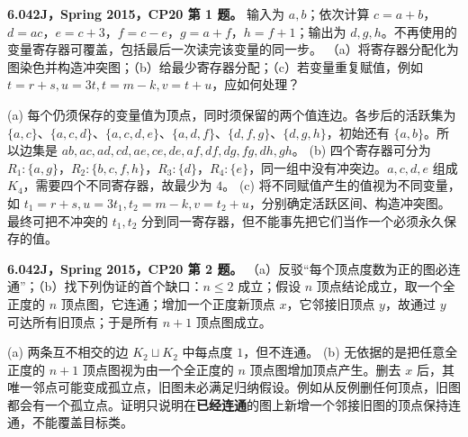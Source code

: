 \begin{exercise}\label{mit:6042-cp20-q1}
\textbf{6.042J，Spring 2015，CP20 第 1 题。}
输入为 $a,b$；依次计算 $c=a+b$，$d=ac$，$e=c+3$，$f=c-e$，$g=a+f$，$h=f+1$；输出为 $d,g,h$。不再使用的变量寄存器可覆盖，包括最后一次读完该变量的同一步。
（a）将寄存器分配化为图染色并构造冲突图；（b）给最少寄存器分配；（c）若变量重复赋值，例如 $t=r+s,u=3t,t=m-k,v=t+u$，应如何处理？
\end{exercise}
\begin{solution}
(a) 每个仍须保存的变量值为顶点，同时须保留的两个值连边。各步后的活跃集为
$\{a,c\}$、$\{a,c,d\}$、$\{a,c,d,e\}$、$\{a,d,f\}$、$\{d,f,g\}$、$\{d,g,h\}$，初始还有 $\{a,b\}$。所以边集是
$ab,ac,ad,cd,ae,ce,de,af,df,dg,fg,dh,gh$。
(b) 四个寄存器可分为 $R_1:\{a,g\}$，$R_2:\{b,c,f,h\}$，$R_3:\{d\}$，$R_4:\{e\}$，同一组中没有冲突边。$a,c,d,e$ 组成 $K_4$，需要四个不同寄存器，故最少为 $4$。
(c) 将不同赋值产生的值视为不同变量，如 $t_1=r+s,u=3t_1,t_2=m-k,v=t_2+u$，分别确定活跃区间、构造冲突图。最终可把不冲突的 $t_1,t_2$ 分到同一寄存器，但不能事先把它们当作一个必须永久保存的值。
\end{solution}

\begin{exercise}\label{mit:6042-cp20-q2}
\textbf{6.042J，Spring 2015，CP20 第 2 题。}
（a）反驳“每个顶点度数为正的图必连通”；（b）找下列伪证的首个缺口：$n\le2$ 成立；假设 $n$ 顶点结论成立，取一个全正度的 $n$ 顶点图，它连通；增加一个正度新顶点 $x$，它邻接旧顶点 $y$，故通过 $y$ 可达所有旧顶点；于是所有 $n+1$ 顶点图成立。
\end{exercise}
\begin{solution}
(a) 两条互不相交的边 $K_2\sqcup K_2$ 中每点度 $1$，但不连通。
(b) 无依据的是把任意全正度的 $n+1$ 顶点图视为由一个全正度的 $n$ 顶点图增加顶点产生。删去 $x$ 后，其唯一邻点可能变成孤立点，旧图未必满足归纳假设。例如从反例删任何顶点，旧图都会有一个孤立点。证明只说明在\textbf{已经连通}的图上新增一个邻接旧图的顶点保持连通，不能覆盖目标类。
\end{solution}

